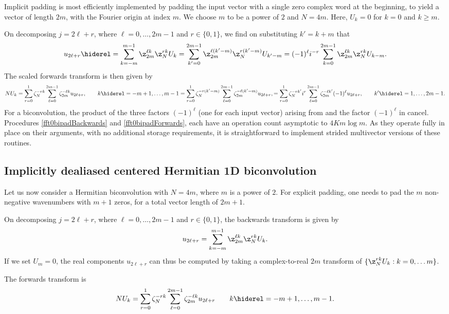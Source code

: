 \documentclass[final]{siamltex}
\def\be{\begin{dmath*}}
\def\ee{\end{dmath*}}
\def\bel{\begin{dmath}}
\def\eel{\end{dmath}}
\def\bec{\begin{dmath*}[compact]}
\let\eec\ee
\def\no{\hiderel}
\begin{document}
Implicit padding is most efficiently implemented by padding the input
vector with a single zero complex word at the beginning, to yield a vector
of length $2m$, with the Fourier origin at index $m$. We choose $m$ to be
a power of $2$ and $N=4m$. Here, $U_k=0$ for $k=0$ and $k\ge m$. 

On decomposing $j=2\ell+r$, where $\ell=0,\ldots, 2m-1$ and $r\in\{0,1\}$,
we find on substituting $k'=k+m$ that
\bel
u_{2\ell +r}\no=\sum_{k=-m}^{m-1}\z_{2m}^{\ell k} \z_N^{rk} U_k
=\sum_{k'=0}^{2m-1}\z_{2m}^{\ell (k'-m)} \z_N^{r(k'-m)} U_{k'-m}
=(-1)^\ell i^{-r}\sum_{k=0}^{2m-1}\z_{2m}^{\ell k} \z_N^{rk} U_{k-m}.
\label{fft0bibackwards}
\eel
The scaled forwards transform is then given by
\bel
NU_k=\sum_{r=0}^{1}\zeta_N^{-rk}\sum_{\ell=0}^{2m-1}\zeta_{2m}^{-\ell k} u_{2\ell+r},
\qquad k\no =-m+1,\ldots,m-1
=\sum_{r=0}^{1}\zeta_N^{-r(k'-m)}\sum_{\ell=0}^{2m-1}\zeta_{2m}^{-\ell (k'-m)} u_{2\ell+r},
=\sum_{r=0}^{1}\zeta_N^{-rk'}i^r\sum_{\ell=0}^{2m-1}\zeta_{2m}^{-\ell k'}(-1)^\ell u_{2\ell+r},
\qquad k'\no =1,\ldots,2m-1.\label{fft0biforwards}
\eel
For a biconvolution, the product of the three factors $(-1)^\ell$
(one for each input vector) arising from 
and the factor $(-1)^\ell$ in  cancel.
Procedures \ref{fft0bipadBackwards} and \ref{fft0bipadForwards},
each have an operation count asymptotic to $4Km\log m$. As they
operate fully in place on their arguments, with no additional storage
requirements, it is straightforward to implement strided multivector
versions of these routines.

\subsection{Implicitly dealiased centered Hermitian 1D biconvolution}
Let us now consider a Hermitian biconvolution with $N=4m$, where $m$ is a
power of $2$. For explicit padding, one needs to pad the $m$ non-negative
wavenumbers with $m+1$ zeros, for a total vector length of $2m+1$.

On decomposing $j=2\ell+r$, where
$\ell=0,\ldots, 2m-1$ and $r\in\{0,1\}$, the backwards transform is given
by
\bec
u_{2\ell +r}=\sum_{k=-m}^{m-1} \z_{2m}^{\ell k} \z_N^{rk} U_k.
\eec
If we set $U_m=0$, the real components $u_{2\ell +r}$ can thus be computed
by taking a complex-to-real $2m$ transform of
$\{\z_N^{rk} U_k : k=0,\ldots m\}$.

The forwards transform is
\be
NU_k=\sum_{r=0}^{1}\zeta_N^{-rk}
\sum_{\ell=0}^{2m-1} \zeta_{2m}^{-\ell k} u_{2\ell+r}
\qquad k\no =-m+1,\ldots,m-1.
\ee
\end{document}
